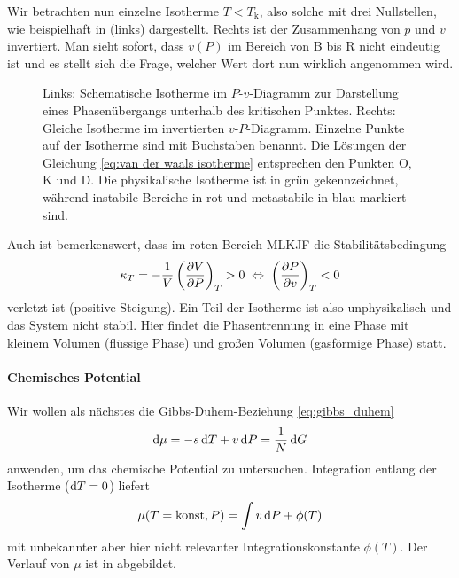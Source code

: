 Wir betrachten nun einzelne Isotherme $T<T_\mathrm{k}$, also solche mit drei Nullstellen, wie beispielhaft in  (links) dargestellt. Rechts ist der Zusammenhang von $p$ und $v$ invertiert. Man sieht sofort, dass $v(P)$ im Bereich von B bis R nicht eindeutig ist und es stellt sich die Frage, welcher Wert dort nun wirklich angenommen wird.

\begin{figure}[htbp]
    \centering
    \tfigPhaseSeparation
    \tfigPhaseSeparationInverted
    \caption{Links: Schematische Isotherme im $P$-$v$-Diagramm zur Darstellung eines Phasenübergangs unterhalb des kritischen Punktes. Rechts: Gleiche Isotherme im invertierten $v$-$P$-Diagramm.
        Einzelne Punkte auf der Isotherme sind mit Buchstaben benannt. Die Lösungen der Gleichung \eqref{eq:van der waals isotherme} entsprechen den Punkten O, K und D. Die physikalische Isotherme ist in grün gekennzeichnet, während instabile Bereiche in rot und metastabile in blau markiert sind. }
    \label{fig:PhaseSeparation}
\end{figure}

Auch ist bemerkenswert, dass im roten Bereich MLKJF die Stabilitätsbedingung
\begin{align*}
    \kappa_T=-\frac{1}{V}\left(\frac{\partial V}{\partial P}\right)_T>0 \;\Leftrightarrow\; \left( \frac{\partial P}{\partial v} \right)_T<0
\end{align*}
verletzt ist (positive Steigung). Ein Teil der Isotherme ist also unphysikalisch und das System nicht stabil. Hier findet die Phasentrennung in eine Phase mit kleinem Volumen (flüssige Phase) und großen Volumen (gasförmige Phase) statt.

\paragraph*{Chemisches Potential}

Wir wollen als nächstes die Gibbs-Duhem-Beziehung \eqref{eq:gibbs_duhem}
\begin{align*}
    \mathop{}\!\mathrm{d}\mu=-s\mathop{}\!\mathrm{d} T+v\mathop{}\!\mathrm{d} P=\frac{1}{N}\mathop{}\!\mathrm{d} G
\end{align*}
anwenden, um das chemische Potential zu untersuchen. Integration entlang der Isotherme ($\mathop{}\!\mathrm{d} T=0$) liefert
\begin{align*}
    \mu(T=\mathrm{konst},P) = \int v\mathop{}\!\mathrm{d} P +\phi(T)
\end{align*}
mit unbekannter aber hier nicht relevanter Integrationskonstante $\phi(T)$. Der Verlauf von $\mu$ ist in  abgebildet.

